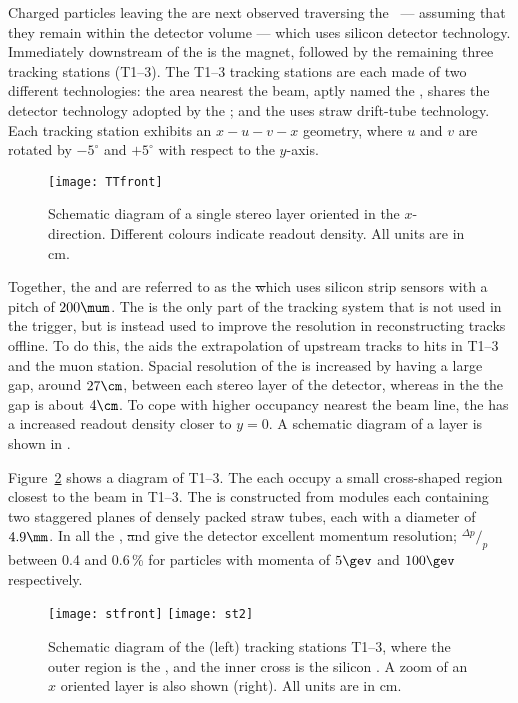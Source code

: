 Charged particles leaving the \velo are next observed traversing the
\ttracker~--- assuming that they remain within the \lhcb detector volume ---
which uses silicon detector technology.
Immediately downstream of the \ttracker is the \lhcb magnet, followed by the remaining three
tracking stations (T1--3).
The T1--3 tracking stations are each made of two different technologies: the area nearest the beam,
aptly named the \intr, shares the detector technology adopted by the \ttracker;
and the \ot uses straw drift-tube technology.
Each tracking station exhibits an $x-u-v-x$ geometry, where $u$ and $v$ are rotated by $-5^\circ$ and
$+5^\circ$ with respect to the $y$-axis.

\begin{figure}
  \begin{center}
    \texttt{[image: TTfront]}
    \caption[Diagram of the LHCb Tracker Turicensis]
    {
      Schematic diagram of a single stereo \ttracker layer oriented in the $x$-direction.
      Different colours indicate readout density.
      All units are in cm.
    }
    \label{fig:lhcb:tt}
  \end{center}
\end{figure}

Together, the \ttracker and \intr are referred to as the \st which
uses silicon strip sensors with a pitch of $200\mum$.
The \ttracker is the only part of the tracking system that is not used in the trigger, but is
instead used to improve the resolution in reconstructing tracks offline.
To do this, the \ttracker aids the extrapolation of upstream tracks to hits in T1--3 and the muon
station.
Spacial resolution of the \ttracker is increased by having a large gap, around $27\cm$, between
each stereo layer of the detector, whereas in the \intr the gap is about $4\cm$.
To cope with higher occupancy nearest the beam line, the \ttracker has a increased readout density
closer to $y=0$.
A schematic diagram of a \ttracker layer is shown in .

Figure~\ref{fig:lhcb:tracking} shows a diagram of T1--3.
The  each occupy a small cross-shaped region closest to the beam in T1--3.
The \ot is constructed from modules each containing two staggered planes of densely packed straw
tubes, each with a diameter of  $4.9\mm$.
In all the \velo, \st and \ot give the \lhcb detector excellent momentum resolution;
$^{\Delta p}/_p$ between 0.4 and 0.6\,\% for particles with momenta of $5\gev$ and $100\gev$
respectively.

\begin{figure}
  \begin{center}
    \texttt{[image: stfront]}
    \texttt{[image: st2]}
  \end{center}
  \caption[Diagram of the LHCb tracking stations T1--3]
  {
      Schematic diagram of the (left) tracking stations T1--3, where the outer region is the \ot,
      and the inner cross is the silicon \intr.
      A zoom of an $x$ oriented \intr layer is also shown (right).
      All units are in cm.
  }
  \label{fig:lhcb:tracking}
\end{figure}



